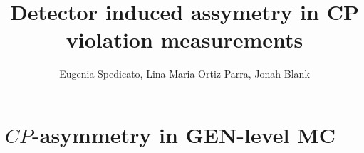 \documentclass[11pt]{beamer}
\author{Eugenia Spedicato, Lina Maria Ortiz Parra, Jonah Blank}
\title{Detector induced assymetry in CP violation measurements}
\begin{document}
\begin{frame}
\titlepage
\end{frame}

\section*{$CP$-asymmetry in GEN-level MC}
\end{document}
